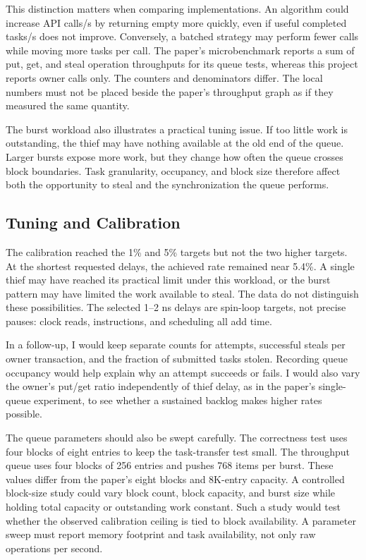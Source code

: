 \documentclass[conference]{IEEEtran}
\begin{document}
This distinction matters when comparing implementations. An algorithm could increase API calls/s by returning empty more quickly, even if useful completed tasks/s does not improve. Conversely, a batched strategy may perform fewer calls while moving more tasks per call. The paper's microbenchmark reports a sum of put, get, and steal operation throughputs for its queue tests, whereas this project reports owner calls only. The counters and denominators differ. The local numbers must not be placed beside the paper's throughput graph as if they measured the same quantity.

The burst workload also illustrates a practical tuning issue. If too little work is outstanding, the thief may have nothing available at the old end of the queue. Larger bursts expose more work, but they change how often the queue crosses block boundaries. Task granularity, occupancy, and block size therefore affect both the opportunity to steal and the synchronization the queue performs.

\subsection{Tuning and Calibration}
The calibration reached the 1\% and 5\% targets but not the two higher targets. At the shortest requested delays, the achieved rate remained near 5.4\%. A single thief may have reached its practical limit under this workload, or the burst pattern may have limited the work available to steal. The data do not distinguish these possibilities. The selected 1--2 ns delays are spin-loop targets, not precise pauses: clock reads, instructions, and scheduling all add time.

In a follow-up, I would keep separate counts for attempts, successful steals per owner transaction, and the fraction of submitted tasks stolen. Recording queue occupancy would help explain why an attempt succeeds or fails. I would also vary the owner's put/get ratio independently of thief delay, as in the paper's single-queue experiment, to see whether a sustained backlog makes higher rates possible.

The queue parameters should also be swept carefully. The correctness test uses four blocks of eight entries to keep the task-transfer test small. The throughput queue uses four blocks of 256 entries and pushes 768 items per burst. These values differ from the paper's eight blocks and 8K-entry capacity. A controlled block-size study could vary block count, block capacity, and burst size while holding total capacity or outstanding work constant. Such a study would test whether the observed calibration ceiling is tied to block availability. A parameter sweep must report memory footprint and task availability, not only raw operations per second.
\end{document}

